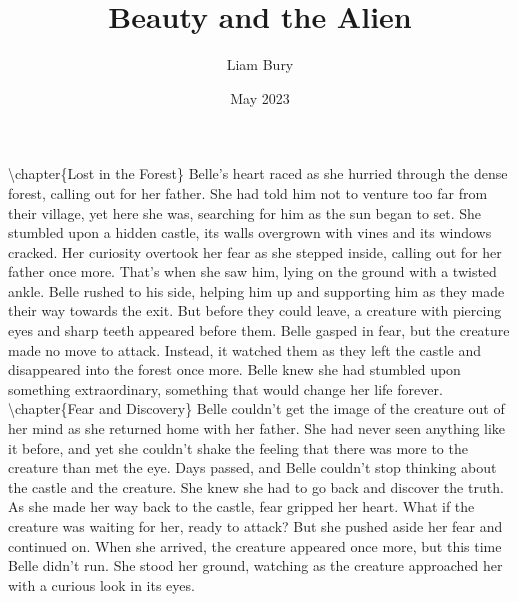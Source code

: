 \documentclass{book}%
\title{Beauty and the Alien}%
\author{Liam Bury}%
\date{May 2023}%
\begin{document}
%
\normalsize%
\maketitle%
\textbackslash{}chapter\{Lost in the Forest\}\newline%
\newline%
Belle's heart raced as she hurried through the dense forest, calling out for her father. She had told him not to venture too far from their village, yet here she was, searching for him as the sun began to set.\newline%
\newline%
She stumbled upon a hidden castle, its walls overgrown with vines and its windows cracked. Her curiosity overtook her fear as she stepped inside, calling out for her father once more.\newline%
\newline%
That's when she saw him, lying on the ground with a twisted ankle. Belle rushed to his side, helping him up and supporting him as they made their way towards the exit. But before they could leave, a creature with piercing eyes and sharp teeth appeared before them.\newline%
\newline%
Belle gasped in fear, but the creature made no move to attack. Instead, it watched them as they left the castle and disappeared into the forest once more. Belle knew she had stumbled upon something extraordinary, something that would change her life forever.%
\textbackslash{}chapter\{Fear and Discovery\}\newline%
\newline%
Belle couldn't get the image of the creature out of her mind as she returned home with her father. She had never seen anything like it before, and yet she couldn't shake the feeling that there was more to the creature than met the eye.\newline%
\newline%
Days passed, and Belle couldn't stop thinking about the castle and the creature. She knew she had to go back and discover the truth.\newline%
\newline%
As she made her way back to the castle, fear gripped her heart. What if the creature was waiting for her, ready to attack? But she pushed aside her fear and continued on.\newline%
\newline%
When she arrived, the creature appeared once more, but this time Belle didn't run. She stood her ground, watching as the creature approached her with a curious look in its eyes.\newline%
\end{document}
